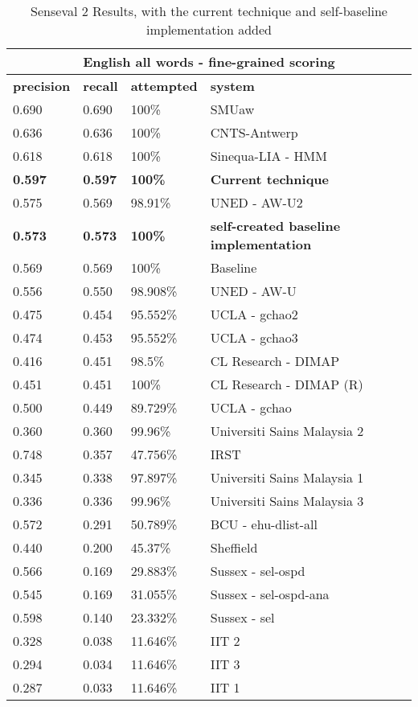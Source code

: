 \begin{table}[htp]
	\centering 
	\begin{tabular}{|l|l|l|l|}
		\hline
		  \multicolumn{4}{|c|}{\bf English all words - fine-grained scoring } \\
		\hline
		{\bf precision } & {\bf recall} & {\bf attempted} & {\bf system} \\ \hline 
		0.690	&	0.690	&	100\%	&		SMUaw \\ \hline
		0.636	&	0.636	&	100\%	&		CNTS-Antwerp \\ \hline
		0.618	&	0.618	&	100\%	&		Sinequa-LIA - HMM \\ \hline
		
		{\bf 0.597} & {\bf 0.597} & {\bf 100\% } &	{\bf Current technique} \\ \hline	
		
		0.575	&	0.569	&	98.91\% &		UNED - AW-U2 \\ \hline
		
		{\bf 0.573} & {\bf 0.573} & {\bf 100\%} &	{\bf self-created baseline implementation } \\ \hline
		
		0.569	&	0.569	&	100\%		&	Baseline \\ \hline
		0.556	&	0.550	&	98.908\%	&	UNED - AW-U	 \\ \hline
		0.475	&	0.454	&	95.552\%	&	UCLA - gchao2 \\ \hline
		0.474	&	0.453	&	95.552\%	&	UCLA - gchao3 \\ \hline
		0.416	&	0.451	&	98.5\%		&	CL Research - DIMAP	 \\ \hline
		0.451	&	0.451	&	100\%		&	CL Research - DIMAP (R)	 \\ \hline
		0.500	&	0.449	&	89.729\%	&	UCLA - gchao \\ \hline
		0.360	&	0.360	&	99.96\%		&	Universiti Sains Malaysia 2	 \\ \hline
		0.748	&	0.357	&	47.756\%	&	IRST \\ \hline
		0.345	&	0.338	&	97.897\%	&	Universiti Sains Malaysia 1 \\ \hline
		0.336	&	0.336	&	99.96\%		&	Universiti Sains Malaysia 3 \\ \hline
		0.572	&	0.291	&	50.789\%	&	BCU - ehu-dlist-all \\ \hline
		0.440	&	0.200	&	45.37\%		&	Sheffield \\ \hline
		0.566	&	0.169	&	29.883\%	&	Sussex - sel-ospd \\ \hline
		0.545	&	0.169	&	31.055\%	&	Sussex - sel-ospd-ana \\ \hline
		0.598	&	0.140	&	23.332\%	&	Sussex - sel \\ \hline
		0.328	&	0.038	&	11.646\%	&	IIT 2 \\ \hline
		0.294	&	0.034	&	11.646\%	&	IIT 3 \\ \hline
		0.287	&	0.033	&	11.646\%	&	IIT 1 \\ \hline
	\end{tabular}
	\caption{Senseval 2 Results, with the current technique and self-baseline implementation added \label{table:SENSEVAL2RESULTS}}
\end{table}

